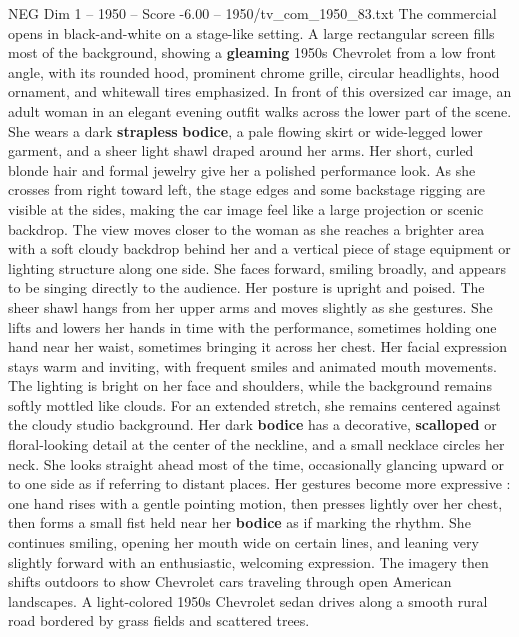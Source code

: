 \begin{textsample}{NEG Dim 1 – 1950 – Score -6.00 – 1950/tv\_com\_1950\_83.txt}  \label{ex:f1_neg_003}
The commercial opens in black-and-white on a stage-like setting.
A large rectangular screen fills most of the background, showing a \textbf{gleaming} 1950s Chevrolet from a low front angle, with its rounded hood, prominent chrome grille, circular headlights, hood ornament, and whitewall tires emphasized.
In front of this oversized car image, an adult woman in an elegant evening outfit walks across the lower part of the scene.
She wears a dark \textbf{strapless} \textbf{bodice}, a pale flowing skirt or wide-legged lower garment, and a sheer light shawl draped around her arms.
Her short, curled blonde hair and formal jewelry give her a polished performance look.
As she crosses from right toward left, the stage edges and some backstage rigging are visible at the sides, making the car image feel like a large projection or scenic backdrop.
The view moves closer to the woman as she reaches a brighter area with a soft cloudy backdrop behind her and a vertical piece of stage equipment or lighting structure along one side.
She faces forward, smiling broadly, and appears to be singing directly to the audience.
Her posture is upright and poised.
The sheer shawl hangs from her upper arms and moves slightly as she gestures.
She lifts and lowers her hands in time with the performance, sometimes holding one hand near her waist, sometimes bringing it across her chest.
Her facial expression stays warm and inviting, with frequent smiles and animated mouth movements.
The lighting is bright on her face and shoulders, while the background remains softly mottled like clouds.
For an extended stretch, she remains centered against the cloudy studio background.
Her dark \textbf{bodice} has a decorative, \textbf{scalloped} or floral-looking detail at the center of the neckline, and a small necklace circles her neck.
She looks straight ahead most of the time, occasionally glancing upward or to one side as if referring to distant places.
Her gestures become more expressive : one hand rises with a gentle pointing motion, then presses lightly over her chest, then forms a small fist held near her \textbf{bodice} as if marking the rhythm.
She continues smiling, opening her mouth wide on certain lines, and leaning very slightly forward with an enthusiastic, welcoming expression.
The imagery then shifts outdoors to show Chevrolet cars traveling through open American landscapes.
A light-colored 1950s Chevrolet sedan drives along a smooth rural road bordered by grass fields and scattered trees.

\end{textsample}
